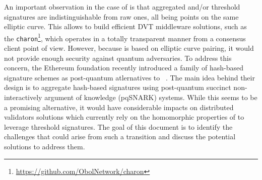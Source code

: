 An important observation in the case of \BLS is that aggregated and/or threshold \BLS signatures are indistinguishable from raw ones, all being points on the same elliptic curve.
This allows to build efficient DVT middleware solutions, such as the \texttt{charon}\footnote{\url{https://github.com/ObolNetwork/charon}}, which operates in a totally transparent manner from a consensus client point of view.
However, because \BLS is based on elliptic curve pairing, it would not provide enough security against quantum adversaries.
To address this concern, the Ethereum foundation recently introduced a family of hash-based signature schemes as post-quantum atlernatives to \BLS~\cite{cryptoeprint:2025/055}.
The main idea behind their design is to aggregate hash-based signatures using post-quantum succinct non-interactively argument of knowledge (pqSNARK) systems. %
While this seems to be a promising alternative, it would have considerable impacts on distributed validators solutions which currently rely on the homomorphic properties of \BLS to leverage threshold signatures.
The goal of this document is to identify the challenges that could arise from such a transition and discuss the potential solutions to address them.

